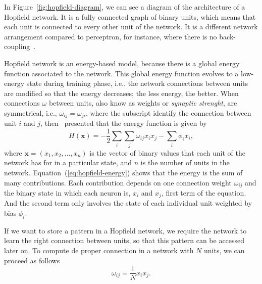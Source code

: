 In Figure~\ref{fig:hopfield-diagram}, we can see a diagram of the architecture of a Hopfield network.
It is a fully connected graph of binary units, which means that each unit is connected to every other unit of the network.
It is a different network arrangement compared to perceptron, for instance, where there is no back-coupling~\cite{bib:hopfield1982}.


Hopfield network is an energy-based model, because there is a global energy function associated to the network.
This global energy function evolves to a low-energy state during training phase, i.e., the network connections between units are modified so that the energy decreases; the less energy, the better.
When connections $\omega$ between units, also know as weights or \textit{synaptic strenght}, are symmetrical, i.e., $\omega_{ij} = \omega_{ji}$, where the subscript identify the connection between unit $i$ and $j$, then~ presented that the energy function is given by
\begin{equation}\label{eq:hopfield-energy}
  H(\mathbf{x}) = -\frac{1}{2}\sum_{i} \sum_{j} \omega_{ij} x_{i} x_{j} - \sum_{i} \phi_{i} x_{i},
\end{equation}
where $\mathbf{x} = (x_{1}, x_{2}, \dots, x_{n})$ is the vector of binary values that each unit of the network has for in a particular state, and $n$ is the number of units in the network.
Equation~(\ref{eq:hopfield-energy}) shows that the energy is the sum of many contributions.
Each contribution depends on one connection weight $\omega_{ij}$ and the binary state in which each neuron is, $x_{i}$ and $x_{j}$, first term of the equation.
And the second term only involves the state of each individual unit weighted by bias $\phi_{i}$.

If we want to store a pattern in a Hopfield network, we require the network to learn the right connection between units, so that this pattern can be accessed later on. To compute de proper connection in a network with $N$ units, we can proceed as follows
\begin{equation}
  \label{eq:hopfield-learn}
  \omega_{ij} = \frac{1}{N} x_{i} x_{j}.
\end{equation}

